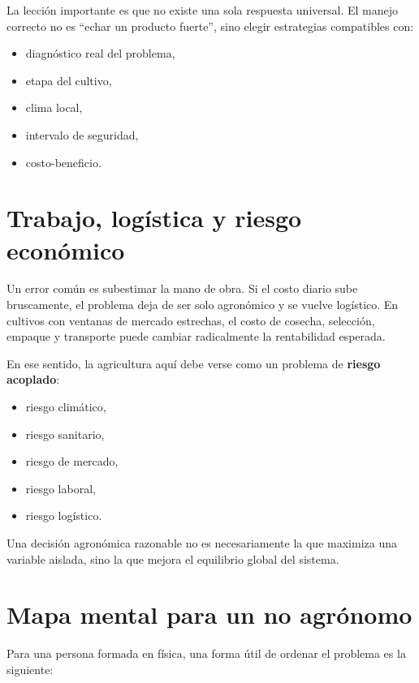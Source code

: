 \documentclass[11pt,a4paper]{article}
\begin{document}
La lección importante es que no existe una sola respuesta universal. El manejo correcto no es \enquote{echar un producto fuerte}, sino elegir estrategias compatibles con:
\begin{itemize}[leftmargin=1.5em]
    \item diagnóstico real del problema,
    \item etapa del cultivo,
    \item clima local,
    \item intervalo de seguridad,
    \item costo-beneficio.
\end{itemize}

\section{Trabajo, logística y riesgo económico}

Un error común es subestimar la mano de obra. Si el costo diario sube bruscamente, el problema deja de ser solo agronómico y se vuelve logístico. En cultivos con ventanas de mercado estrechas, el costo de cosecha, selección, empaque y transporte puede cambiar radicalmente la rentabilidad esperada.

En ese sentido, la agricultura aquí debe verse como un problema de \textbf{riesgo acoplado}:
\begin{itemize}[leftmargin=1.5em]
    \item riesgo climático,
    \item riesgo sanitario,
    \item riesgo de mercado,
    \item riesgo laboral,
    \item riesgo logístico.
\end{itemize}

Una decisión agronómica razonable no es necesariamente la que maximiza una variable aislada, sino la que mejora el equilibrio global del sistema.

\section{Mapa mental para un no agrónomo}

Para una persona formada en física, una forma útil de ordenar el problema es la siguiente:
\end{document}
